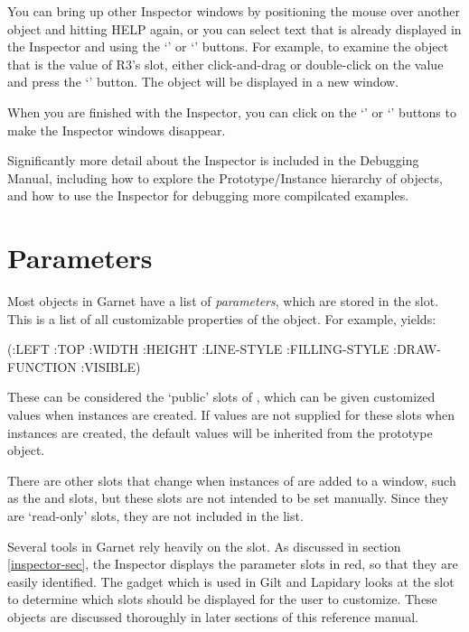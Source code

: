 You can bring up other Inspector windows by positioning the mouse over another
object and hitting HELP again, or you can select text that is already displayed
in the Inspector and using the `' or `'
buttons.  For example, to examine the  object that is the
value of R3's  slot, either click-and-drag or double-click
on the  value and press the `' button.
The object will be displayed in a new window.

When you are finished with the Inspector, you can click on the `' or
`' buttons to make the Inspector windows disappear.

Significantly more detail about the Inspector is included in the Debugging
Manual, including how to explore the Prototype/Instance hierarchy of objects,
and how to use the Inspector for debugging more compilcated examples.


\section{Parameters}
\label{parameters}

Most objects in Garnet have a list of {\it parameters}, which are stored in the
 slot.  This is a list of all customizable properties of
the object.  For example,  yields:

\begin{programexample}
(:LEFT :TOP :WIDTH :HEIGHT :LINE-STYLE :FILLING-STYLE :DRAW-FUNCTION :VISIBLE)
\end{programexample}

These can be considered the `public' slots of , which can
be given customized values when instances are created.  If values are not
supplied for these slots when instances are created, the default values will
be inherited from the prototype object.

There are other slots that change when instances of  are
added to a window, such as the  and  slots, but these
slots are not intended to be set manually.  Since they are `read-only' slots,
they are not included in the  list.

Several tools in Garnet rely heavily on the  slot.
As discussed in section \ref{inspector-sec}, the Inspector displays the
parameter slots in red, so that they are easily identified.  The
 gadget which is used in Gilt and Lapidary looks at the
 slot to determine which slots should be displayed for the
user to customize.  These objects are discussed thoroughly in later sections
of this reference manual.

